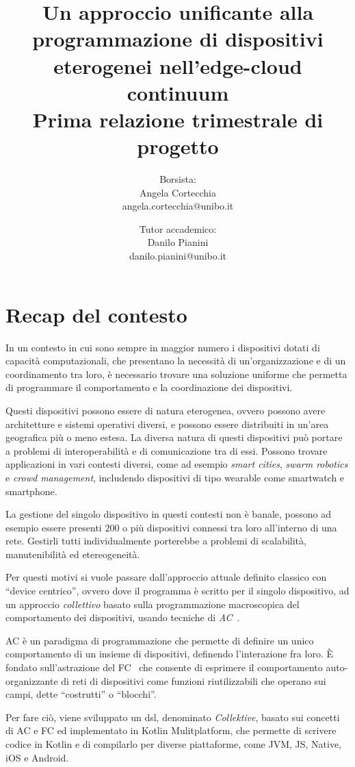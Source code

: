 \documentclass[13pt, a4paper]{article}
\title{\LARGE
    Un approccio unificante alla programmazione di dispositivi eterogenei nell'edge-cloud continuum \\ \small Prima relazione trimestrale di progetto
}
\author{
   Borsista: \\Angela Cortecchia \\ \small angela.cortecchia@unibo.it
    \and
    Tutor accademico: \\Danilo Pianini \\ \small danilo.pianini@unibo.it
}
\newcommand{\ck}{\emph{Collektive}}
\begin{document}
\maketitle
\clearpage


\section{Recap del contesto}
\label{sec:context}
In un contesto in cui sono sempre in maggior numero i dispositivi dotati di capacità computazionali,
    che presentano la necessità di un'organizzazione e di un coordinamento tra loro,
    è necessario trovare una soluzione uniforme che permetta di programmare il comportamento e la coordinazione dei dispositivi.

Questi dispositivi possono essere di natura eterogenea, ovvero possono avere architetture e sistemi operativi diversi,
    e possono essere distribuiti in un'area geografica più o meno estesa.
%
La diversa natura di questi dispositivi può portare a problemi di interoperabilità e di comunicazione tra di essi.
%
Possono trovare applicazioni in vari contesti diversi, come ad esempio \emph{smart cities}, \emph{swarm robotics} e \emph{crowd management},
    includendo dispositivi di tipo wearable come smartwatch e smartphone.

La gestione del singolo dispositivo in questi contesti non è banale, possono ad esempio essere presenti $200$ o più dispositivi
    connessi tra loro all'interno di una rete.
%
Gestirli tutti individualmente porterebbe a problemi di scalabilità, manutenibilità ed etereogeneità.

Per questi motivi si vuole passare dall'approccio attuale definito classico con ``device centrico'', ovvero dove il programma è scritto per il singolo dispositivo,
    ad un approccio \emph{collettivo} basato sulla programmazione macroscopica del comportamento dei dispositivi,
    usando tecniche di \emph{\ac{AC}}~\cite{BealIEEEComputer2015}.

\ac{AC} è un paradigma di programmazione che permette di definire un unico comportamento di un insieme di dispositivi,
    definendo l'interazione fra loro.
%
È fondato sull'astrazione del \ac{FC}~\cite{JLAMP2019} che consente di esprimere il comportamento auto-organizzante di reti
    di dispositivi come funzioni riutilizzabili che operano sui campi, dette ``costrutti'' o ``blocchi''.

Per fare ciò, viene sviluppato un \ac{dsl}, denominato \ck{}, basato sui concetti di \ac{AC} e \ac{FC} ed implementato in Kotlin Mulitplatform,
    che permette di scrivere codice in Kotlin e di compilarlo per diverse piattaforme, come JVM, JS, Native, iOS e Android.
\end{document}
